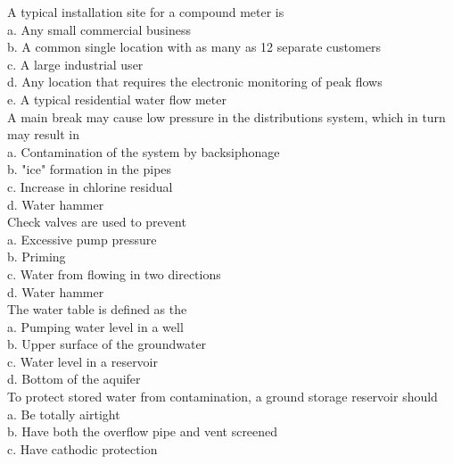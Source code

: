 A typical installation site for a compound meter is\\
a.	Any small commercial business\\
b.	A common single location with as many as 12 separate customers\\
c.	A large industrial user\\
d.	Any location that requires the electronic monitoring of peak flows\\
e.	A typical residential water flow meter\\


  A main break may cause low pressure in the distributions system, which in turn may result in\\

a. Contamination of the system by backsiphonage\\

b. "ice" formation in the pipes\\

c. Increase in chlorine residual\\

d. Water hammer\\

Check valves are used to prevent\\

a. Excessive pump pressure\\

b. Priming\\

c. Water from flowing in two directions\\

d. Water hammer\\

The water table is defined as the\\
a. Pumping water level in a well\\
b. Upper surface of the groundwater\\
c. Water level in a reservoir\\
d. Bottom of the aquifer\\

  To protect stored water from contamination, a ground storage reservoir should\\


a. Be totally airtight\\

b. Have both the overflow pipe and vent screened\\

c. Have cathodic protection\\

